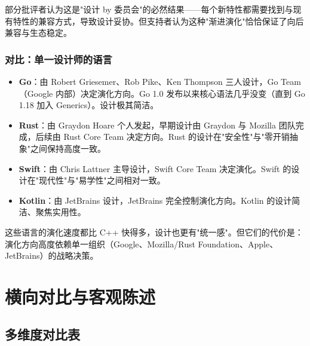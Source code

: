 \documentclass[12pt,a4paper,fontset=fandol]{ctexbook}
\begin{document}
部分批评者认为这是"设计 by 委员会"的必然结果——每个新特性都需要找到与现有特性的兼容方式，导致设计妥协。但支持者认为这种"渐进演化"恰恰保证了向后兼容与生态稳定。

\subsection{对比：单一设计师的语言}

\begin{itemize}
  \item \textbf{Go}：由 Robert Griesemer、Rob Pike、Ken Thompson 三人设计，Go Team（Google 内部）决定演化方向。Go 1.0 发布以来核心语法几乎没变（直到 Go 1.18 加入 Generics）。设计极其简洁。
  \item \textbf{Rust}：由 Graydon Hoare 个人发起，早期设计由 Graydon 与 Mozilla 团队完成，后续由 Rust Core Team 决定方向。Rust 的设计在"安全性"与"零开销抽象"之间保持高度一致。
  \item \textbf{Swift}：由 Chris Lattner 主导设计，Swift Core Team 决定演化。Swift 的设计在"现代性"与"易学性"之间相对一致。
  \item \textbf{Kotlin}：由 JetBrains 设计，JetBrains 完全控制演化方向。Kotlin 的设计简洁、聚焦实用性。
\end{itemize}

这些语言的演化速度都比 C++ 快得多，设计也更有"统一感"。但它们的代价是：演化方向高度依赖单一组织（Google、Mozilla/Rust Foundation、Apple、JetBrains）的战略决策。

\chapter{横向对比与客观陈述}

\section{多维度对比表}
\end{document}

